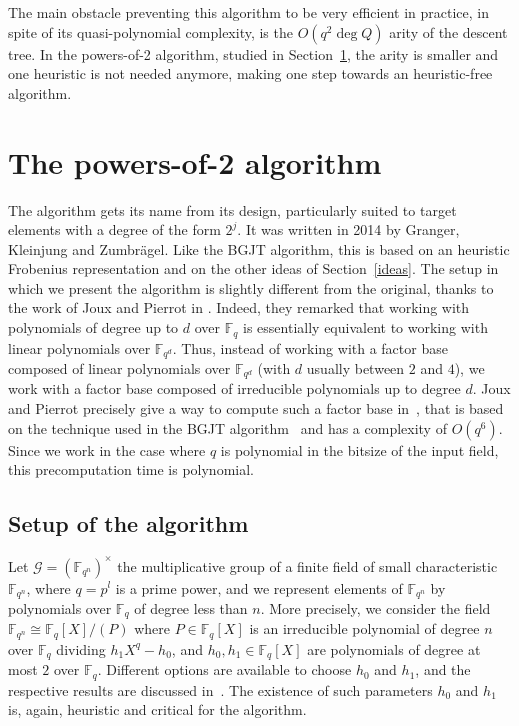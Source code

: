 \documentclass[a4paper,11pt]{article}
\theoremstyle{break}
\theoremstyle{sc}
\theoremstyle{definition}
\theoremstyle{remark}
\begin{document}
The main obstacle preventing this algorithm to be very efficient in practice, in
spite of its quasi-polynomial complexity, is the $O(q^2\deg Q)$ arity  of the
descent tree. In the powers-of-2 algorithm, studied in
Section~\ref{powers-of-2}, the arity is smaller and one heuristic is not needed
anymore, making one step towards an heuristic-free algorithm.

\section{The powers-of-2 algorithm}
\label{powers-of-2}

The algorithm gets its name from its design, particularly suited to target
elements with a degree of the form $2^j$. It was written in 2014 by Granger,
Kleinjung and Zumbrägel. Like the BGJT algorithm, this is based on an heuristic
Frobenius representation and on the other ideas of Section~\ref{ideas}.
The setup in which we present the algorithm is slightly different from
the original, thanks to the work of Joux and Pierrot in \cite{JP14}. Indeed,
they remarked that working with polynomials of degree up to $d$ over $\mathbb{F}_q$ is
essentially equivalent to working with linear polynomials over $\mathbb{F}_{q^d}$. Thus,
instead of working with a factor base composed of linear polynomials over
$\mathbb{F}_{q^d}$ (with $d$ usually between $2$ and $4$), we work with a
factor base composed of irreducible polynomials up to degree $d$. Joux and Pierrot
precisely give a way to compute such a factor base in~\cite{JP14}, that is based
on the technique used in the BGJT algorithm~\cite{Joux13, BGJT13} and has a
complexity of $O(q^6)$. Since we work in the case where $q$ is polynomial in the
bitsize of the input field, this precomputation time is polynomial.

\subsection{Setup of the algorithm}

Let $\mathcal G = (\mathbb{F}_{q^n})^\times$ the multiplicative group of a finite
field of small characteristic $\mathbb{F}_{q^n}$, where $q=p^l$ is a prime
power, and we represent elements of $\mathbb{F}_{q^n}$ by polynomials over
$\mathbb{F}_q$ of degree less than $n$. More
precisely, we consider the field $\mathbb{F}_{q^n}\cong \mathbb{F}_{q}[X]/(P)$
where $P\in \mathbb{F}_{q}[X]$ is an irreducible polynomial of degree $n$ over
$\mathbb{F}_{q}$ dividing $h_1X^q-h_0$, and $h_0, h_1\in \mathbb{F}_q[X]$ are
polynomials of degree at most $2$ over $\mathbb{F}_q$. Different options are
available to choose $h_0$ and $h_1$, and the respective results are 
discussed in~\cite{JP14}. The existence of such parameters $h_0$ and $h_1$ is,
again, heuristic and critical for the algorithm.
\end{document}
